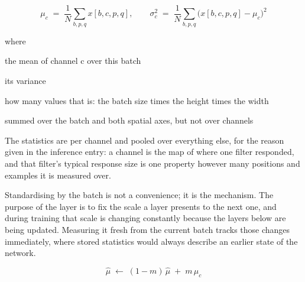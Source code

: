 \begin{equation}
\mu_c \;=\; \frac{1}{N} \sum_{b,p,q} x[b,c,p,q], \qquad \sigma^2_c \;=\; \frac{1}{N} \sum_{b,p,q} \big(x[b,c,p,q] - \mu_c\big)^2
\end{equation}

\noindent where
\begin{description}[leftmargin=2.4em,style=nextline,font=\normalfont\ttfamily]\setlength\itemsep{1pt}
  \item[{$\mu_c$}] \normalfont the mean of channel c over this batch
  \item[{$\sigma^2_c$}] \normalfont its variance
  \item[{$N$}] \normalfont how many values that is: the batch size times the height times the width
  \item[{$\sum_{b,p,q}$}] \normalfont summed over the batch and both spatial axes, but not over channels
\end{description}
The statistics are per channel and pooled over everything else, for the reason given in the inference entry: a channel is the map of where one filter responded, and that filter's typical response size is one property however many positions and examples it is measured over.


Standardising by the batch is not a convenience; it is the mechanism. The purpose of the layer is to fix the scale a layer presents to the next one, and during training that scale is changing constantly because the layers below are being updated. Measuring it fresh from the current batch tracks those changes immediately, where stored statistics would always describe an earlier state of the network.



\begin{equation}
\hat{\mu} \;\leftarrow\; (1-m)\,\hat{\mu} \;+\; m\,\mu_c
\end{equation}

